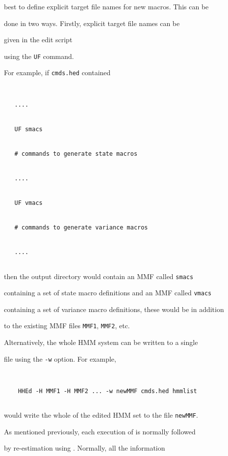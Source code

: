 best to define explicit target file names for new macros.  This can be


done in two ways.  Firstly,   explicit target file names can be 


given in the edit script


using the \texttt{UF} command.


For example, if \texttt{cmds.hed} contained


\begin{verbatim}


   ....


   UF smacs


   # commands to generate state macros


   ....


   UF vmacs


   # commands to generate variance macros


   ....


\end{verbatim}


then the output directory would contain an MMF called \texttt{smacs} 


containing a set of state macro definitions and an MMF called \texttt{vmacs} 


containing a set of variance macro definitions, these would be in addition


to the existing MMF files \texttt{MMF1}, \texttt{MMF2}, etc.





Alternatively, the whole HMM system can be written to a single


file using the \texttt{-w} option.  For example, 


\begin{verbatim}


    HHEd -H MMF1 -H MMF2 ... -w newMMF cmds.hed hmmlist


\end{verbatim}


would write the whole of the edited HMM set to the file \texttt{newMMF}.







As mentioned previously, each execution of  is normally followed


by re-estimation using .  Normally, all the information


